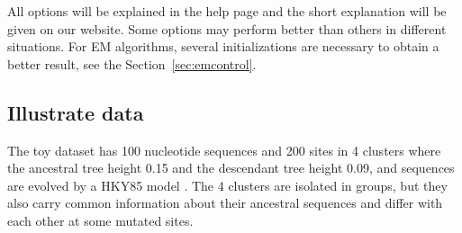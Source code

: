 All options will be explained in the help page and the short explanation
will be given on our website.
Some options may perform better than others in different situations.
For EM algorithms, several initializations are necessary to obtain
a better result, see the Section~\ref{sec:emcontrol}.




\subsection[Illustrate data]{Illustrate data}
\label{sec:illustrate}

The toy dataset has 100 nucleotide sequences and 200 sites in 4 clusters
where the ancestral tree height 0.15 and the descendant tree height 0.09,
and sequences are evolved by a HKY85 model \citep{Hasegawa1985}.
The 4 clusters are isolated
in groups, but they also carry common information about their ancestral
sequences and differ with each other at some mutated sites.

